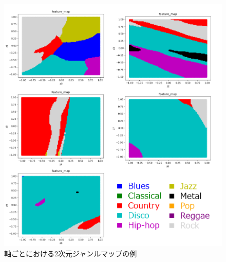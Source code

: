 \begin{figure}
	\begin{center}
		\includegraphics[scale=1]{./images/visualize/map0.png}
		\caption{軸ごとにおける2次元ジャンルマップの例}
		\label{fig:featmap}
	\end{center}
\end{figure}